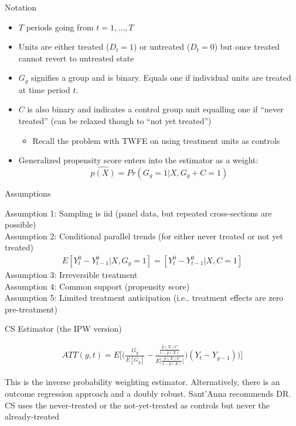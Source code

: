 \documentclass{beamer}
\begin{document}
\begin{frame}{Notation}

\begin{itemize}
\item $T$ periods going from $t=1, \dots, T$
\item Units are either treated ($D_t=1$) or untreated ($D_t=0$) but once treated cannot revert to untreated state
\item $G_g$ signifies a group and is binary.  Equals one if individual units are treated at time period $t$.
\item $C$ is also binary and indicates a control group unit equalling one if ``never treated'' (can be relaxed though to ``not yet treated'')
	\begin{itemize}
	\item Recall the problem with TWFE on using treatment units as controls
	\end{itemize}
\item Generalized propensity score enters into the estimator as a weight: $$\widehat{p(X)} = Pr(G_g=1 | X,G_g+C=1)$$
\end{itemize}

\end{frame}

\begin{frame}{Assumptions}

Assumption 1: Sampling is iid (panel data, but repeated cross-sections are possible) \\
\bigskip
Assumption 2: Conditional parallel trends (for either never treated or not yet treated) \\
\begin{eqnarray*}
E[Y_t^0 - Y_{t-1}^0 | X,G_g=1] = [Y_t^0 - Y_{t-1}^0 | X,C=1] 
\end{eqnarray*}
\bigskip
Assumption 3: Irreversible treatment \\
Assumption 4: Common support (propensity score) \\
\bigskip
Assumption 5: Limited treatment anticipation (i.e., treatment effects are zero pre-treatment)

\end{frame}

\begin{frame}{CS Estimator (the IPW version)}

\begin{eqnarray*}
ATT(g,t) = E \bigg [ \bigg ( \frac{G_g}{E[G_g]} - \frac{ \frac{\hat{p}(X)C}{1-\hat{p}(X)}}{E \bigg [ \frac{\hat{p}(X)C}{1-\hat{p}(X)} \bigg ]} \bigg ) (Y_t - Y_{g-1} ) \bigg ) \bigg ]
\end{eqnarray*}

This is the inverse probability weighting estimator.  Alternatively, there is an outcome regression approach and a doubly robust. Sant'Anna recommends DR.  CS uses the never-treated or the not-yet-treated as controls but never the already-treated 
\end{frame}
\end{document}
